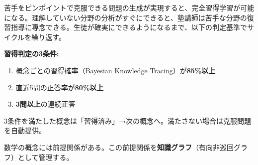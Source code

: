 \documentclass[paper=a4,fontsize=10.5bp,jafontsize=10.5bp,twocolumn]{jlreq}
\begin{document}
苦手をピンポイントで克服できる問題の生成が実現すると、完全習得学習が可能になる。理解していない分野の分析がすぐにできると、塾講師は苦手な分野の復習指導に専念できる。生徒が確実にできるようになるまで、以下の判定基準でサイクルを繰り返す。

\begin{graybox}
\textbf{習得判定の3条件:}
\begin{enumerate}[leftmargin=2em]
  \item 概念ごとの習得確率（Bayesian Knowledge Tracing）が\textbf{85\%以上}
  \item 直近5問の正答率が\textbf{80\%以上}
  \item \textbf{3問以上}の連続正答
\end{enumerate}
3条件を満たした概念は「習得済み」→次の概念へ。満たさない場合は克服問題を自動提供。
\end{graybox}

数学の概念には前提関係がある。この前提関係を\textbf{知識グラフ}（有向非巡回グラフ）として管理する。
\end{document}
